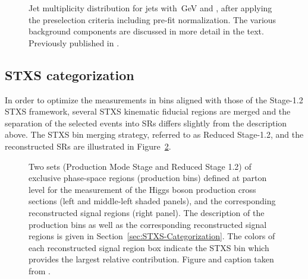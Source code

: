 \begin{figure}
    \caption{Jet multiplicity distribution for jets with \,GeV and , after applying the preselection criteria including pre-fit normalization. The various background components are discussed in more detail in the text. Previously published in .}
    \label{fig:njet-dist}
\end{figure}


\subsection{STXS categorization}
\label{subsec:STXS-categorization}
In order to optimize the measurements in bins aligned with those of the Stage-1.2 STXS framework, several STXS kinematic fiducial regions are merged and the separation of the selected events into SRs differs slightly from the description above.
The STXS bin merging strategy, referred to as Reduced Stage-1.2, and the reconstructed SRs are illustrated in Figure~\ref{fig:STXS_Diagram}.

\begin{figure}[t]
    \caption{Two sets (Production Mode Stage and Reduced Stage 1.2) of exclusive phase-space regions (production bins) defined at parton level for the measurement of the Higgs boson production cross sections (left and middle-left shaded panels), and the corresponding reconstructed signal regions (right panel).
    The description of the production bins as well as the corresponding reconstructed signal regions is given in Section~\ref{sec:STXS-Categorization}.
    The colors of each reconstructed signal region box indicate the STXS bin which provides the largest relative contribution. Figure and caption taken from .
    \label{fig:STXS_Diagram}
    }
\end{figure}


